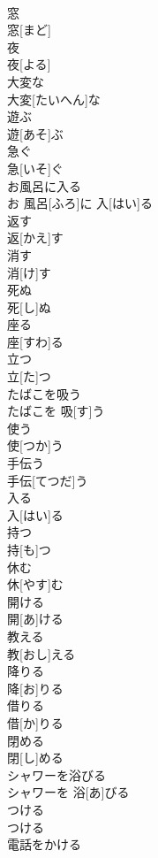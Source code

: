 \documentclass[8pt]{extreport}
\begin{document}
\begin{CJK}{UTF8}{min}
\\	窓	
\\	窓[まど]		
\\	夜	
\\	夜[よる]		
\\	大変な	
\\	大変[たいへん]な		
\\	遊ぶ	
\\	遊[あそ]ぶ		
\\	急ぐ	
\\	急[いそ]ぐ		
\\	お風呂に入る	
\\	お 風呂[ふろ]に 入[はい]る		
\\	返す	
\\	返[かえ]す		
\\	消す	
\\	消[け]す		
\\	死ぬ	
\\	死[し]ぬ		
\\	座る	
\\	座[すわ]る		
\\	立つ	
\\	立[た]つ		
\\	たばこを吸う	
\\	たばこを 吸[す]う		
\\	使う	
\\	使[つか]う		
\\	手伝う	
\\	手伝[てつだ]う		
\\	入る	
\\	入[はい]る		
\\	持つ	
\\	持[も]つ		
\\	休む	
\\	休[やす]む		
\\	開ける	
\\	開[あ]ける		
\\	教える	
\\	教[おし]える		
\\	降りる	
\\	降[お]りる		
\\	借りる	
\\	借[か]りる		
\\	閉める	
\\	閉[し]める		
\\	シャワーを浴びる	
\\	シャワーを 浴[あ]びる		
\\	つける	
\\	つける		
\\	電話をかける	

\end{CJK}
\end{document}
